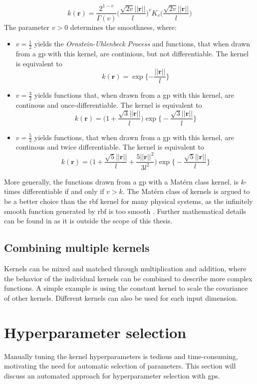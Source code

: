 \begin{equation}\label{eq:kernel_matern}
    k(\boldsymbol{r}) = \frac{2^{1-v}}{\Gamma(v)}\bigg(\frac{\sqrt{2 v} ||\boldsymbol{r}||}{l} \bigg)^v K_v \bigg(\frac{\sqrt{2v} || \boldsymbol{r}||}{l} \bigg)
\end{equation}
The parameter $v > 0$ determines the smoothness, where:
\begin{itemize}
    \item $v=\frac{1}{2}$ yields the \textit{Ornstein-Uhlenbeck Process} and functions, that when drawn from a \acrshort{gp} with this kernel, are continious, but not differentiable. The kernel is equivalent to $$k(\boldsymbol{r}) = \exp \{-\frac{||\boldsymbol{r}||}{l}\}$$
    \item $v=\frac{3}{2}$ yields functions that, when drawn from a \acrshort{gp} with this kernel, are continous and once-differentiable. The kernel is equivalent to $$k(\boldsymbol{r}) = \big(1 + \frac{\sqrt{3} ||\boldsymbol{r}||}{l}\big) \exp\big\{- \frac{\sqrt{3} ||\boldsymbol{r}||}{l}\big\}$$
    \item $v=\frac{5}{2}$ yields functions, that when drawn from a \acrshort{gp} with this kernel,  are continous and twice differentiable. The kernel is equivalent to $$k(\boldsymbol{r}) = \big(1 + \frac{\sqrt{5} ||\boldsymbol{r}||}{l} + \frac{5 ||\boldsymbol{r}||^2}{3 l^2}\big) \exp\big\{- \frac{\sqrt{5} ||\boldsymbol{r}||}{l}\big\}$$
\end{itemize}
More generally, the functions drawn from a \acrshort{gp} with a Matérn class kernel, is $k$-times differentiable if and only if $v > k$\cite{rasmussen}. The Matérn class of kernels is argued to be a better choice than the \acrshort{rbf} kernel for many physical systems, as the infinitely smooth function generated by \acrshort{rbf} is too smooth \cite{rasmussen}.
Further mathematical details can be found in \cite[sec.~4.2]{rasmussen} as it is outside the scope of this thesis.


\subsection{Combining multiple kernels}
Kernels can be mixed and matched through multiplication and addition, where the behavior of the individual kernels can be combined to describe more complex functions. A simple example is using the constant kernel to scale the covariance of other kernels. Different kernels can also be used for each input dimension.
\section{Hyperparameter selection}
Manually tuning the kernel hyperparameters is tedious and time-consuming, motivating the need for automatic selection of parameters. This section will discuss an automated approach for hyperparameter selection with \acrshort{gp}s.

